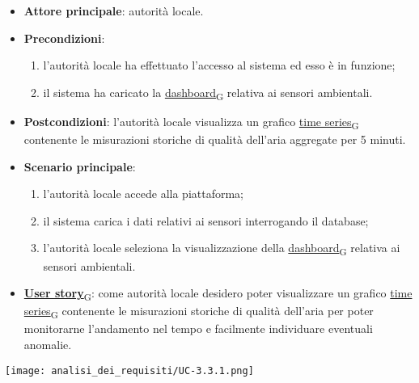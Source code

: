 \newpage
{}
\begin{itemize}
	\item \textbf{Attore principale}: autorità locale.
	\item \textbf{Precondizioni}:
	      \begin{enumerate}
		      \item l'autorità locale ha effettuato l'accesso al sistema ed esso è in funzione;
		      \item il sistema ha caricato la \href{https://7last.github.io/docs/pb/documentazione-interna/glossario\#dashboard}{dashboard\textsubscript{G}} relativa ai sensori ambientali.
	      \end{enumerate}
	\item \textbf{Postcondizioni}: l'autorità locale visualizza un grafico \href{https://7last.github.io/docs/pb/documentazione-interna/glossario\#time-series}{time series\textsubscript{G}} contenente le misurazioni storiche
	      di qualità dell'aria aggregate per 5 minuti.
	\item \textbf{Scenario principale}:
	      \begin{enumerate}
		      \item l'autorità locale accede alla piattaforma;
		      \item il sistema carica i dati relativi ai sensori interrogando il database;
		      \item l'autorità locale seleziona la visualizzazione della \href{https://7last.github.io/docs/pb/documentazione-interna/glossario\#dashboard}{dashboard\textsubscript{G}} relativa ai sensori ambientali.
	      \end{enumerate}
	\item \href{https://7last.github.io/docs/pb/documentazione-interna/glossario\#user-story}{\textbf{User story}\textsubscript{G}}:
	      come autorità locale desidero poter visualizzare un grafico \href{https://7last.github.io/docs/pb/documentazione-interna/glossario\#time-series}{time series\textsubscript{G}} contenente le misurazioni storiche
	      di qualità dell'aria per poter monitorarne l'andamento nel tempo e facilmente individuare eventuali anomalie.
\end{itemize}
\begin{center}
	\texttt{[image: analisi\_dei\_requisiti/UC-3.3.1.png]}
\end{center}


